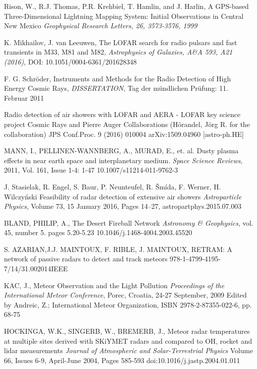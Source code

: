 \documentclass[twoside]{ctuthesis}
\theoremstyle{plain}
\theoremstyle{definition}
\theoremstyle{note}
\begin{document}
\begin{thebibliography}{99}
Rison, W., R.J. Thomas, P.R. Krehbiel, T. Hamlin, and J. Harlin, A GPS-based Three-Dimensional Lightning Mapping System: Initial Observations in Central New Mexico
\emph{Geophysical Research Letters, 26, 3573-3576, 1999}

K. Mikhailov, J. van Leeuwen, 
The LOFAR search for radio pulsars and fast transients in M33, M81 and M82,
\emph{Astrophysics of Galaxies, A\&A 593, A21 (2016)}, DOI: 10.1051/0004-6361/201628348

F. G. Schröder, Instruments and Methods for the Radio Detection of High Energy Cosmic Rays,
\emph{DISSERTATION}, Tag der mündlichen Prüfung: 11. Februar 2011

Radio detection of air showers with LOFAR and AERA - LOFAR key science project Cosmic Rays and Pierre Auger Collaborations (Hörandel, Jörg R. for the collaboration) JPS Conf.Proc. 9 (2016) 010004 arXiv:1509.04960 [astro-ph.HE]

MANN, I., PELLINEN-WANNBERG, A., MURAD, E., et. al.
Dusty plasma effects in near earth space and interplanetary medium.
\emph{Space Science Reviews}, 2011, Vol. 161, Issue 1-4: 1-47 
10.1007/s11214-011-9762-3 

J. Stasielak, R. Engel, S. Baur, P. Neunteufel, R. Šmída, F. Werner, H. Wilczyński
Feasibility of radar detection of extensive air showers
\emph{Astroparticle Physics}, Volume 73, 15 January 2016, Pages 14–27, astropartphys.2015.07.003 


BLAND, PHILIP, A.,
The Desert Fireball Network
\emph{Astronomy \& Geophysics}, vol. 45, number 5. pages 5.20-5.23
10.1046/j.1468-4004.2003.45520

S. AZARIAN,J.J. MAINTOUX, F. RIBLE, J. MAINTOUX,
RETRAM: A network of passive radars to detect and 
track meteors
978-1-4799-4195-7/14/31.002014IEEE

KAC, J.,
Meteor Observation and the Light Pollution
\emph{Proceedings of the International Meteor Conference}, Porec, Croatia, 24-27 September, 2009 Edited by Andreic, Z.;  International Meteor Organization, ISBN 2978-2-87355-022-6, pp. 68-75

HOCKINGA, W.K., SINGERB, W., BREMERB, J.,
Meteor radar temperatures at multiple sites derived with SKiYMET radars and compared to OH, rocket and lidar measurements
\emph{Journal of Atmospheric and Solar-Terrestrial Physics}
Volume 66, Issues 6-9, April-June 2004, Pages 585-593
doi:10.1016/j.jastp.2004.01.011


\end{thebibliography}
\end{document}
